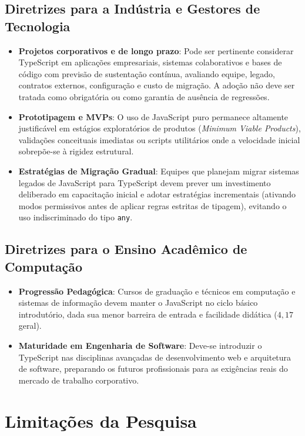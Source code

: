 \subsection{Diretrizes para a Indústria e Gestores de Tecnologia}
\begin{itemize}
    \item \textbf{Projetos corporativos e de longo prazo}: Pode ser pertinente considerar TypeScript em aplicações empresariais, sistemas colaborativos e bases de código com previsão de sustentação contínua, avaliando equipe, legado, contratos externos, configuração e custo de migração. A adoção não deve ser tratada como obrigatória ou como garantia de ausência de regressões.
    \item \textbf{Prototipagem e MVPs}: O uso de JavaScript puro permanece altamente justificável em estágios exploratórios de produtos (\textit{Minimum Viable Products}), validações conceituais imediatas ou scripts utilitários onde a velocidade inicial sobrepõe-se à rigidez estrutural.
    \item \textbf{Estratégias de Migração Gradual}: Equipes que planejam migrar sistemas legados de JavaScript para TypeScript devem prever um investimento deliberado em capacitação inicial e adotar estratégias incrementais (ativando modos permissivos antes de aplicar regras estritas de tipagem), evitando o uso indiscriminado do tipo \texttt{any}.
\end{itemize}

\subsection{Diretrizes para o Ensino Acadêmico de Computação}
\begin{itemize}
    \item \textbf{Progressão Pedagógica}: Cursos de graduação e técnicos em computação e sistemas de informação devem manter o JavaScript no ciclo básico introdutório, dada sua menor barreira de entrada e facilidade didática ($4,17$ geral).
    \item \textbf{Maturidade em Engenharia de Software}: Deve-se introduzir o TypeScript nas disciplinas avançadas de desenvolvimento web e arquitetura de software, preparando os futuros profissionais para as exigências reais do mercado de trabalho corporativo.
\end{itemize}

\section{Limitações da Pesquisa}
\label{sec:limitacoes}

